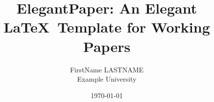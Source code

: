 
\newcommand{\authorname}{FirstName LASTNAME}
\newcommand{\universityname}{Example University}

\title{ElegantPaper: An Elegant \LaTeX\ Template for Working Papers}
\author{\authorname \\ \universityname}

\date{\today}

